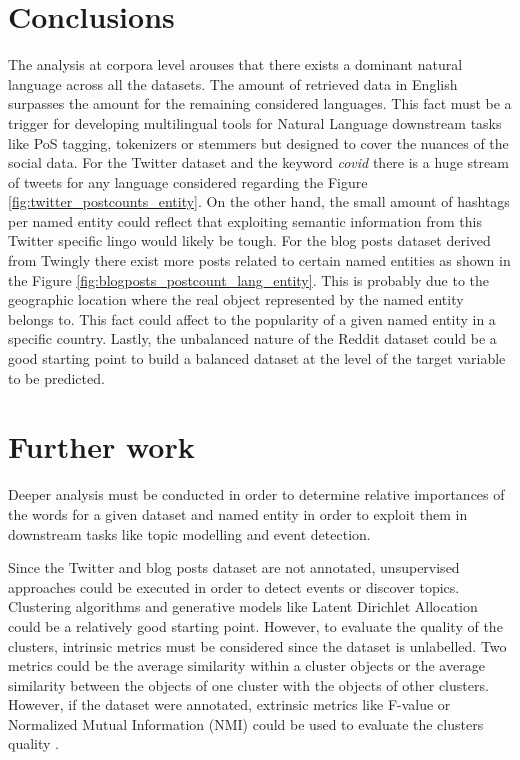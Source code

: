 \section{Conclusions}


The analysis at corpora level arouses that there exists a dominant natural language across all the datasets. The amount of retrieved data in English surpasses the amount for the remaining considered languages. This fact must be a trigger for developing multilingual tools for Natural Language downstream tasks like PoS tagging, tokenizers or stemmers but designed to cover the nuances of the social data. For the Twitter dataset and the keyword \textit{covid} there is a huge stream of tweets for any language considered regarding the Figure \ref{fig:twitter_postcounts_entity}. On the other hand, the small amount of hashtags per named entity could reflect that exploiting semantic information from this Twitter specific lingo would likely be tough. For the blog posts dataset derived from Twingly there exist more posts related to certain named entities as shown in the Figure \ref{fig:blogposts_postcount_lang_entity}. This is probably due to the geographic location where the real object represented by the named entity belongs to. This fact could affect to the popularity of a given named entity in a specific country. Lastly, the unbalanced nature of the Reddit dataset could be a good starting point to build a balanced dataset at the level of the target variable to be predicted.


\section{Further work}
Deeper analysis must be conducted in order to determine relative importances of the words for a given dataset and named entity in order to exploit them in downstream tasks like topic modelling and event detection.
\par Since the Twitter and blog posts dataset are not annotated, unsupervised approaches could be executed in order to detect events or discover topics. Clustering algorithms and generative models like Latent Dirichlet Allocation \citep{Blei2003} could be a relatively good starting point. However, to evaluate the quality of the clusters, intrinsic metrics must be considered since the dataset is unlabelled. Two metrics could be the average similarity within a cluster objects or the average similarity between the objects of one cluster with the objects of other clusters. However, if the dataset were annotated, extrinsic metrics like F-value or Normalized Mutual Information (NMI) could be used to evaluate the clusters quality \citep{clusteringTopicModellingTwitterReddit}.

